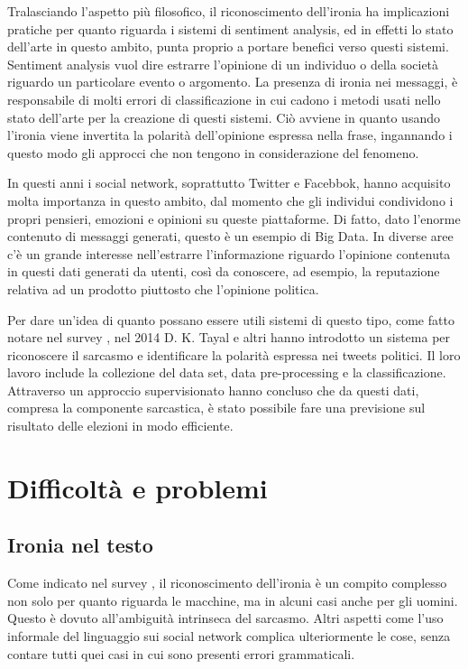 \documentclass[oneside]{book}
\begin{document}
Tralasciando l'aspetto più filosofico, il riconoscimento dell'ironia ha implicazioni pratiche per quanto riguarda i sistemi di sentiment analysis, ed in effetti lo stato dell'arte in questo ambito, punta proprio a portare benefici verso questi sistemi. Sentiment analysis vuol dire estrarre l'opinione di un individuo o della società riguardo un particolare evento o argomento. La presenza di ironia nei messaggi, è responsabile di molti errori di classificazione in cui cadono i metodi usati nello stato dell'arte per la creazione di questi sistemi. Ciò avviene in quanto usando l'ironia viene invertita la polarità dell'opinione espressa nella frase, ingannando i questo modo gli approcci che non tengono in considerazione del fenomeno.

In questi anni i social network, soprattutto Twitter e Facebbok, hanno acquisito molta importanza in questo ambito, dal momento che gli individui condividono i propri pensieri, emozioni e opinioni su queste piattaforme. Di fatto, dato l'enorme contenuto di messaggi generati, questo è un esempio di Big Data. In diverse aree c'è un grande interesse nell'estrarre l'informazione riguardo l'opinione contenuta in questi dati generati da utenti, così da conoscere, ad esempio, la reputazione relativa ad un prodotto piuttosto che l'opinione politica.

Per dare un'idea di quanto possano essere utili sistemi di questo tipo, come fatto notare nel survey \cite{survey1}, nel 2014 D. K. Tayal e altri \cite{political} hanno introdotto un sistema per riconoscere il sarcasmo e identificare la polarità espressa nei tweets politici. Il loro lavoro include la collezione del data set, data pre-processing e la classificazione. Attraverso un approccio supervisionato hanno concluso che da questi dati, compresa la componente sarcastica, è stato possibile fare una previsione sul risultato delle elezioni in modo efficiente.

\section{Difficoltà e problemi}

\subsection{Ironia nel testo}
Come indicato nel survey \cite{survey3}, il riconoscimento dell'ironia è un compito complesso non solo per quanto riguarda le macchine, ma in alcuni casi anche per gli uomini. Questo è dovuto all'ambiguità intrinseca del sarcasmo. Altri aspetti come l'uso informale del linguaggio sui social network complica ulteriormente le cose, senza contare tutti quei casi in cui sono presenti errori grammaticali.
\end{document}
